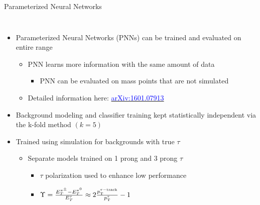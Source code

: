 \documentclass[aspectratio=169,xcolor=table]{beamer}
\begin{document}
    \begin{frame}[t]{Parameterized Neural Networks}
      \begin{columns}[t]
      \vspace{-0.5cm}
      \begin{itemize}
      \small
      \item Parameterized Neural Networks (PNNs) can be trained and evaluated on entire \mHpm range
      \begin{itemize}
        \item PNN learns more information with the same amount of data
        \begin{itemize}
          \item PNN can be evaluated on mass points that are not simulated
        \end{itemize}
        \item Detailed information here: \href{https://arxiv.org/abs/1601.07913}{\textcolor{blue}{arXiv:1601.07913}}
      \end{itemize}
      \item Background modeling and classifier training kept statistically independent via the k-fold method $(k=5)$
      \item Trained using simulation for backgrounds with true $\tau$
      \begin{itemize}
      \item Separate models trained on 1 prong and 3 prong $\tau$
      \begin{itemize}
        \item $\tau$ polarization used to enhance low \mHpm performance
        \item $\Upsilon = \frac{ E^{\pi^{\pm}}_{T} - E^{\pi^{0}}_{T}}{E^{\tau}_{T}} \approx 2 \frac{p_{\text{T}}^{\tau-\mathrm{track}}}{p_{\text{T}}^{\tau}} -1$

\end{itemize}
\end{itemize}
\end{itemize}
\end{columns}
\end{frame}
\end{document}

